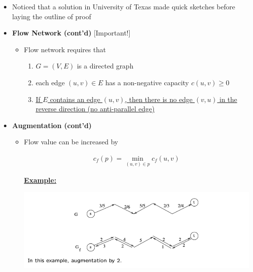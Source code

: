 \documentclass[12pt]{article}
\begin{document}
\begin{enumerate}[1.]
\begin{itemize}
        \item Noticed that a solution in University of Texas made quick sketches
        before laying the outline of proof

        \item \textbf{Flow Network (cont'd)} [Important!]

        \begin{itemize}
            \item Flow network requires that

            \begin{enumerate}[1)]
                \item $G = (V,E)$ is a directed graph
                \item each edge $(u,v) \in E$ has a non-negative capacity $c(u,v) \geq 0$
                \item \color{red}\ul{If $E$ contains an edge $(u,v)$, then there is no edge $(v,u)$ in the reverse direction (no anti-parallel edge)}\color{black}
            \end{enumerate}
        \end{itemize}

        \item \textbf{Augmentation (cont'd)}

        \begin{itemize}
            \item Flow value can be increased by

            \begin{align}
                c_f(p) = \min_{(u,v) \in p} c_f(u,v)
            \end{align}

            \bigskip

            \underline{\textbf{Example:}}

            \begin{center}
            \includegraphics[width=\linewidth]{images/worksheet_5_solution_20.png}
            \end{center}



\end{itemize}
\end{itemize}
\end{enumerate}
\end{document}
